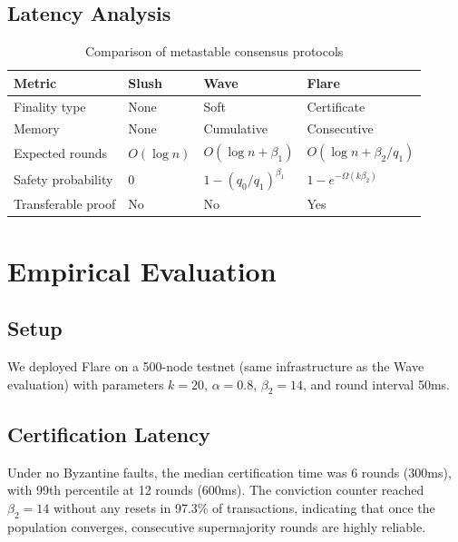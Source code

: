 \documentclass[11pt,a4paper]{article}
\begin{document}
\subsection{Latency Analysis}

\begin{table}[h]
\centering
\begin{tabular}{@{}llll@{}}
\toprule
\textbf{Metric} & \textbf{Slush} & \textbf{Wave} & \textbf{Flare} \\
\midrule
Finality type & None & Soft & Certificate \\
Memory & None & Cumulative & Consecutive \\
Expected rounds & $O(\log n)$ & $O(\log n + \beta_1)$ & $O(\log n + \beta_2/q_1)$ \\
Safety probability & $0$ & $1 - (q_0/q_1)^{\beta_1}$ & $1 - e^{-\Omega(k\beta_2)}$ \\
Transferable proof & No & No & Yes \\
\bottomrule
\end{tabular}
\caption{Comparison of metastable consensus protocols}
\label{tab:comparison}
\end{table}

\section{Empirical Evaluation}
\label{sec:evaluation}

\subsection{Setup}

We deployed Flare on a 500-node testnet (same infrastructure as the Wave evaluation)
with parameters $k = 20$, $\alpha = 0.8$, $\beta_2 = 14$, and round interval 50ms.

\subsection{Certification Latency}

Under no Byzantine faults, the median certification time was 6 rounds (300ms), with
99th percentile at 12 rounds (600ms). The conviction counter reached $\beta_2 = 14$
without any resets in 97.3\% of transactions, indicating that once the population
converges, consecutive supermajority rounds are highly reliable.
\end{document}
